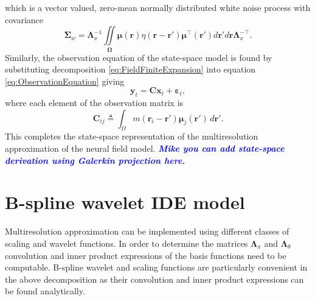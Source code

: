 \documentclass[journal,a4paper]{IEEEtran}
\newcommand{\parham}[1]{\textsf{\emph{\textbf{\textcolor{blue}{#1}}}}}
\begin{document}
which is a vector valued, zero-mean normally distributed white noise process with covariance \cite{Scerri2009}
\begin{equation}
\boldsymbol\Sigma_w =\mathbf{\Lambda}_{x}^{-1}\iint\limits_{\boldsymbol\Omega}\boldsymbol\mu\left(\mathbf{r}\right)\eta\left(\mathbf{r}-\mathbf{r'}\right)\boldsymbol\mu^{\top}\left(\mathbf{r'}\right)d\mathbf{r'}d\mathbf{r}\mathbf{\Lambda}_{x}^{-\top}.
\end{equation}
Similarly, the observation equation of the state-space model is found by substituting decomposition \eqref{eq:FieldFiniteExpansion}
 into equation \eqref{eq:ObservationEquation} giving
\begin{equation}\label{ObservationEquation} 
	\mathbf{y}_t = \mathbf{C}\mathbf{x}_t + \boldsymbol{\varepsilon}_t,
\end{equation}
where each element of the observation matrix is 
\begin{equation}
	\mathbf{C}_{ij} \triangleq \int_{\Omega}m(\mathbf{r}_i - \mathbf{r}')\boldsymbol{\mu}_j(\mathbf{r}') \, d\mathbf{r}'.
\end{equation}
This completes the state-space representation of the multiresolution approximation of the neural field model. 
\parham{Mike you can add state-space derivation using Galerkin projection here.}
\section{B-spline wavelet IDE model}
Multiresolution approximation can be implemented using different classes of scaling and wavelet functions. In order to determine the matrices $ \boldsymbol\Lambda_x$ and $\boldsymbol \Lambda_{\theta}$ convolution and inner product expressions of the basis functions need to be computable. B-spline wavelet and scaling functions are particularly convenient in the above decomposition as their convolution and inner product expressions can be found analytically.
\end{document}
